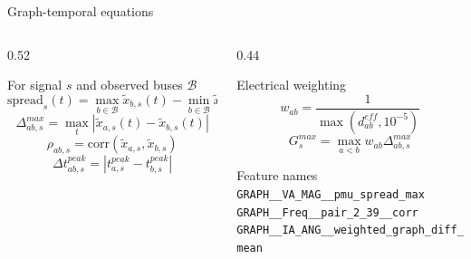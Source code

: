 \documentclass[10pt,aspectratio=169]{beamer}
\newcommand{\code}[1]{\texttt{\footnotesize #1}}
\begin{document}
\begin{frame}{Graph-temporal equations}
\small
\begin{columns}[T,totalwidth=\textwidth]
\begin{column}{0.52\textwidth}
\begin{block}{For signal $s$ and observed buses $\mathcal{B}$}
\[
\mathrm{spread}_s(t)=
\max_{b\in\mathcal{B}}\tilde{x}_{b,s}(t)
-
\min_{b\in\mathcal{B}}\tilde{x}_{b,s}(t)
\]
\[
\Delta_{ab,s}^{max}=\max_t|\tilde{x}_{a,s}(t)-\tilde{x}_{b,s}(t)|
\]
\[
\rho_{ab,s}=\mathrm{corr}(\tilde{x}_{a,s},\tilde{x}_{b,s})
\]
\[
\Delta t^{peak}_{ab,s}=
\left|t^{peak}_{a,s}-t^{peak}_{b,s}\right|
\]
\end{block}
\end{column}
\begin{column}{0.44\textwidth}
\begin{alertblock}{Electrical weighting}
\[
w_{ab}=\frac{1}{\max(d^{eff}_{ab},10^{-5})}
\]
\[
G_s^{max}=\max_{a<b}
w_{ab}\Delta_{ab,s}^{max}
\]
\end{alertblock}
\begin{exampleblock}{Feature names}
\code{GRAPH\_\_VA\_MAG\_\_pmu\_spread\_max}\\
\code{GRAPH\_\_Freq\_\_pair\_2\_39\_\_corr}\\
\code{GRAPH\_\_IA\_ANG\_\_weighted\_graph\_diff\_mean}
\end{exampleblock}
\end{column}
\end{columns}
\end{frame}
\end{document}
